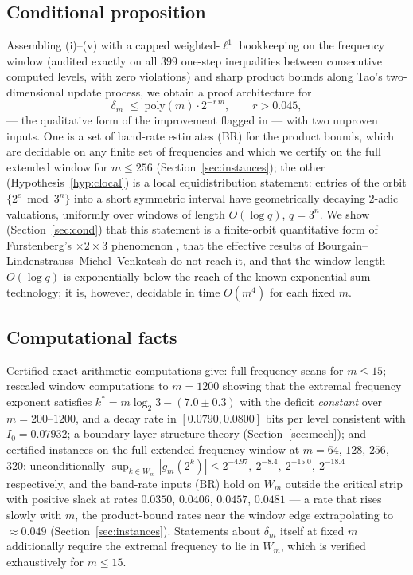 \documentclass[11pt]{article}
\theoremstyle{definition}
\begin{document}
\subsection*{Conditional proposition} Assembling (i)--(v) with a
capped weighted-$\ell^1$ bookkeeping on the frequency window (audited
exactly on all $399$ one-step inequalities between consecutive computed
levels, with zero violations) and sharp product bounds along Tao's
two-dimensional update process, we obtain a proof architecture for
\[
\delta_m\;\le\;\mathrm{poly}(m)\cdot 2^{-r\,m},\qquad r>0.045,
\]
--- the qualitative form of the improvement flagged in \cite{Tao2022} ---
with two unproven inputs. One is a set of band-rate estimates (BR) for
the product bounds, which are decidable on any finite set of frequencies
and which we certify on the full extended window for $m\le 256$
(Section~\ref{sec:instances}); the other (Hypothesis~\ref{hyp:clocal})
is a local equidistribution statement: entries of the orbit
$\{2^e\bmod 3^n\}$ into a short symmetric interval have geometrically
decaying $2$-adic valuations, uniformly over windows of length
$O(\log q)$, $q=3^n$. We show (Section~\ref{sec:cond}) that this
statement is a finite-orbit quantitative form of Furstenberg's
$\times 2\times 3$ phenomenon \cite{Furstenberg1967}, that the effective
results of Bourgain--Lindenstrauss--Michel--Venkatesh \cite{BLMV2009} do
not reach it, and that the window length $O(\log q)$ is exponentially
below the reach of the known exponential-sum technology; it is, however,
decidable in time $O(m^4)$ for each fixed $m$.

\subsection*{Computational facts} Certified exact-arithmetic computations
give: full-frequency scans for $m\le 15$; rescaled window computations to
$m=1200$ showing that the extremal frequency exponent satisfies
$k^*=m\log_2 3-(7.0\pm0.3)$ with the deficit \emph{constant} over
$m=200$--$1200$, and a decay rate in $[0.0790, 0.0800]$ bits per level
consistent with $I_0=0.07932$; a boundary-layer structure theory
(Section~\ref{sec:mech}); and certified instances on the full extended
frequency window at $m=64$, $128$, $256$, $320$: unconditionally
$\sup_{k\in W_m}|g_m(2^k)|\le 2^{-4.97},\ 2^{-8.4},\ 2^{-15.0},\ 2^{-18.4}$
respectively, and the band-rate inputs (BR) hold on $W_m$ outside the
critical strip with positive slack at rates $0.0350$, $0.0406$, $0.0457$,
$0.0481$ --- a rate that rises slowly with $m$, the product-bound rates
near the window edge extrapolating to $\approx 0.049$
(Section~\ref{sec:instances}). Statements about
$\delta_m$ itself at fixed $m$ additionally require the extremal frequency
to lie in $W_m$, which is verified exhaustively for $m\le 15$.
\end{document}
